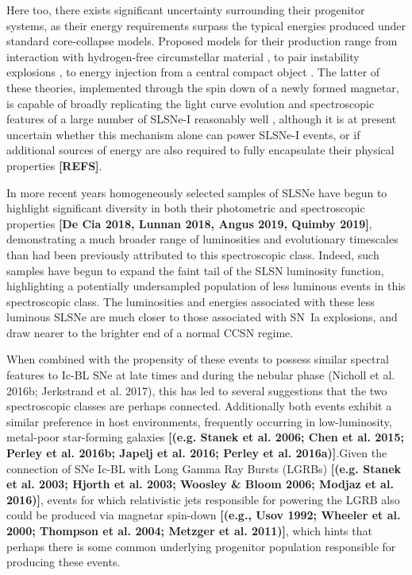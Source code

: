 \documentclass[a4paper,fleqn,usenatbib]{mnras}
\newcommand{\angus}[1]{\color{JungleGreen}#1\color{black}}
\newcommand{\comment}[1]{\textbf{[#1]}}
\begin{document}
Here too, there exists significant uncertainty surrounding their progenitor systems, as their energy requirements surpass the typical energies produced under standard core-collapse models. Proposed models for their production range from interaction with hydrogen-free circumstellar material \citep{Chevalier2011,Chatzopoulos2013,Sorokina2016}, to pair instability explosions \citep{Woosley2007,Yan2015}, to energy injection from a central compact object \citep{Kasen2010,Woosley2010,Inserra2013}. The latter of these theories, implemented through the spin down of a newly formed magnetar, is capable of broadly replicating the light curve evolution and spectroscopic features of a large number of SLSNe-I reasonably well \citep{Dessart2012,Inserra2013,Nicholl2013,Mazzali2016,Nicholl2017B}, although it is at present uncertain whether this mechanism alone can power SLSNe-I events, or if additional sources of energy are also required to fully encapsulate their physical properties \comment{\angus{REFS}}. 

In more recent years homogeneously selected samples of SLSNe have begun to highlight significant diversity in both their photometric and spectroscopic properties \comment{\angus{De Cia 2018, Lunnan 2018, Angus 2019, Quimby 2019}}, demonstrating a much broader range of luminosities and evolutionary timescales than had been previously attributed to this spectroscopic class. Indeed, such samples have begun to expand the faint tail of the SLSN luminosity function, highlighting a potentially undersampled population of less luminous events in this spectroscopic class. The luminosities and energies associated with these less luminous SLSNe are much closer to those associated with SN~Ia explosions, and draw nearer to the brighter end of a normal CCSN regime. 

When combined with the propensity of these events to possess similar spectral features to Ic-BL SNe at late times and during the nebular phase {\angus{(Nicholl et al. 2016b; Jerkstrand et al. 2017)}}, this has led to several suggestions that the two spectroscopic classes are perhaps connected. Additionally both events exhibit a similar preference in host environments, frequently occurring in low-luminosity, metal-poor star-forming galaxies \comment{\angus{(e.g. Stanek et al. 2006; Chen et al. 2015; Perley et al. 2016b; Japelj et al. 2016; Perley et al. 2016a)}}.Given the connection of SNe Ic-BL with Long Gamma Ray Bursts (LGRBs) \comment{\angus{(e.g. Stanek et al. 2003; Hjorth et al. 2003; Woosley \& Bloom 2006; Modjaz et al. 2016)}}, events for which relativistic jets responsible for powering the LGRB also could be produced via magnetar spin-down \comment{\angus{(e.g., Usov 1992; Wheeler et al. 2000; Thompson et al. 2004; Metzger et al. 2011)}}, which hints that perhaps there is some common underlying progenitor population responsible for producing these events.
\end{document}
